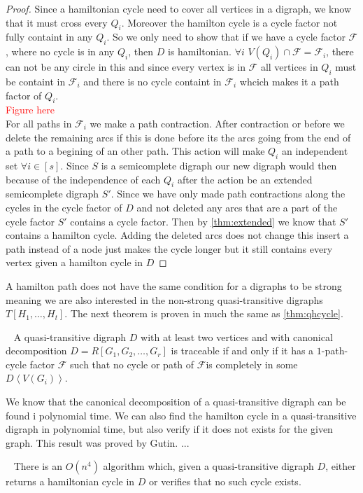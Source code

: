 \begin{proof}
    Since a hamiltonian cycle need to cover all vertices in a digraph, we know that it must cross every $Q_i$. 
    Moreover the hamilton cycle is a cycle factor not fully containt in any $Q_i$. So we only need to show that if we have a cycle factor $\mathcal{F}$, where no cycle is in any $Q_i$, then $D$ is hamiltonian. $\forall i$ $V(Q_i)\cap \mathcal{F}=\mathcal{F}_i$, there can not be any circle in this and since every vertex is in $\mathcal{F}$ all vertices in $Q_i$ must be containt in $\mathcal{F}_i$ and there is no cycle containt in $\mathcal{F}_i$ whcich makes it a path factor of $Q_i$.\\
    \textcolor{red}{Figure here}\\
    For all paths in $\mathcal{F}_i$ we make a path contraction. 
    After contraction or before we delete the remaining arcs if this is done before its the arcs going from the end of a path to a begining of an other path. This action will make $Q_i$ an independent set $\forall i\in [s]$. Since $S$ is a semicomplete digraph our new digraph would then because of the independence of each $Q_i$ after the action be an extended semicomplete digraph $S'$. 
    Since we have only made path contractions along the cycles in the cycle factor of $D$ and not deleted any arcs that are a part of the cycle factor $S'$ contains a cycle factor. 
    Then by \autoref{thm:extended} we know that $S'$ contains a hamilton cycle. Adding the deleted arcs does not change this insert a path instead of a node just makes the cycle longer but it still contains every vertex given a hamilton cycle in $D$
\end{proof}

A hamilton path does not have the same condition for a digraphs to be strong meaning we are also interested in the non-strong quasi-transitive digraphs $T[H_1,\dots ,H_t]$. 
The next theorem is proven in much the same as \autoref{thm:qhcycle}. 
\begin{thm}~\cite{bangJGT20}
    A quasi-transitive digraph $D$ with at least two vertices and with canonical decomposition $D=R[G_1,G_2,\dots , G_r]$ is traceable if and only if it has a $1$-path-cycle factor $\mathcal{F}$ such that no cycle or path of $\mathcal{F}$is completely in some $D\left< V(G_i)\right>$.
\end{thm}

We know that the canonical decomposition of a quasi-transitive digraph can be found i polynomial time. 
We can also find the hamilton cycle in a quasi-transitive digraph in polynomial time, but also verify if it does not exists for the given graph. This result was proved by Gutin. ... 

\begin{thm}~\cite{banggutin94}
    There is an $O(n^4)$ algorithm which, given a quasi-transitive digraph $D$, either returns a hamiltonian cycle in $D$ or verifies that no such cycle exists.
\end{thm}




